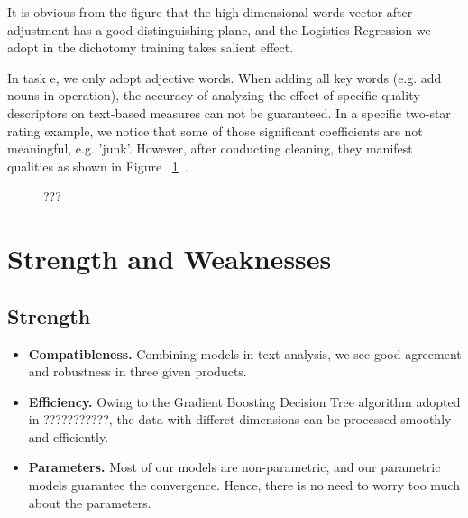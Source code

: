 \documentclass[12pt]{article}%
\begin{document}
It is obvious from the figure that the high-dimensional words vector after adjustment has a good distinguishing plane, and the Logistics Regression we adopt in the dichotomy training takes salient effect.

In task e, we only adopt adjective words. When adding all key words (e.g. add nouns in operation), the accuracy of analyzing the effect of specific quality descriptors on text-based measures can not be guaranteed. In a specific two-star rating example, we notice that some of those significant coefficients are not meaningful, e.g. 'junk'. However, after conducting cleaning, they manifest qualities as shown in Figure ~\ref{fissssg}~.


\begin{figure}[H]
	\centering
	\caption{???}
	\label{fissssg}
\end{figure}






\section{Strength and Weaknesses}
\subsection{Strength}
\begin{itemize}
	\item \textbf{Compatibleness.} Combining models in text analysis, we see good agreement and robustness in three given products.%
	\item \textbf{Efficiency.} Owing to the Gradient Boosting Decision Tree algorithm adopted in ???????????, the data with differet dimensions can be processed smoothly and efficiently.
	\item \textbf{Parameters.} Most of our models are non-parametric, and our parametric models guarantee
	the convergence. Hence, there is no need to worry too much about the parameters.
\end{itemize}
\end{document}

